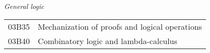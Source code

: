 
{\it General logic}\\[4pt]
\begin{tabular}{ll}
\phantom{XX} 03B35 &  Mechanization of proofs and logical operations\\ %
\phantom{XX} 03B40 &  Combinatory logic and lambda-calculus\\ %
\end{tabular}

